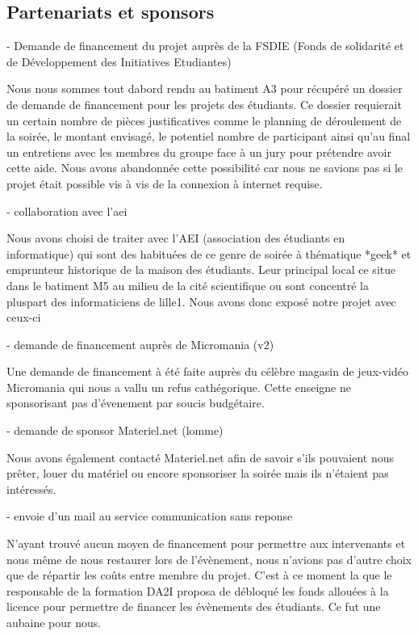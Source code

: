 \subsection{Partenariats et sponsors}%
\label{sub:partenariats_et_sponsors}

- Demande de financement du projet auprès de la FSDIE (Fonds de solidarité
et de Développement des Initiatives Etudiantes)

Nous nous sommes tout dabord rendu au batiment A3 pour récupéré un
dossier de demande de financement pour les projets des étudiants. Ce
dossier requierait un certain nombre de pièces justificatives comme le
planning de déroulement de la soirée, le montant envisagé, le potentiel
nombre de participant ainsi qu'au final un entretiens avec les membres
du groupe face à un jury pour prétendre avoir cette aide. Nous avons
abandonnée cette possibilité car nous ne savions pas si le projet était
possible vis à vis de la connexion à internet requise.

- collaboration avec l'aei

Nous avons choisi de traiter avec l'AEI (association des étudiants
en informatique) qui sont des habituées de ce genre de soirée à
thématique *geek* et emprunteur historique de la maison des étudiants.
Leur principal local ce situe dans le batiment M5 au milieu de la
cité scientifique ou sont concentré la pluspart des informaticiens de
lille1.
Nous avons donc exposé notre projet avec ceux-ci

- demande de financement auprès de Micromania (v2)

Une demande de financement à été faite auprès du célèbre magasin de
jeux-vidéo Micromania qui nous a vallu un refus cathégorique. Cette
enseigne ne sponsorisant pas d'évenement par soucis
budgétaire.

- demande de sponsor Materiel.net (lomme)

Nous avons également contacté Materiel.net afin de savoir s'ils pouvaient nous prêter,
louer du matériel ou encore sponsoriser la soirée mais ils n'étaient pas intéressés.

- envoie d'un mail au service communication sans reponse

N'ayant trouvé aucun moyen de financement pour permettre aux
intervenants et nous même de nous restaurer lors de l'évènement, nous
n'avions pas d'autre choix que de répartir les coûts entre membre du
projet. C'est à ce moment la que le responsable de la formation DA2I
proposa de débloqué les fonds allouées à la licence pour permettre de
financer les évènements des étudiants. Ce fut une aubaine pour nous.


